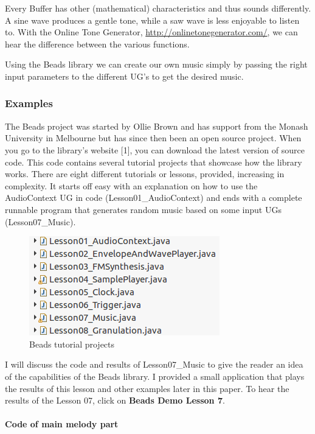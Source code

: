 \documentclass[12pt]{article}
\begin{document}
Every Buffer has other (mathematical) characteristics and thus sounds differently. A sine wave produces a gentle tone, while a saw wave is less enjoyable to listen to. With the Online Tone Generator, \url{http://onlinetonegenerator.com/}, we can hear the difference between the various functions.
\newline

Using the Beads library we can create our own music simply by passing the right input parameters to the different UG's to get the desired music.

\subsubsection{Examples}

The Beads project was started by Ollie Brown and has support from the Monash University in Melbourne but has since then been an open source project. When you go to the library's website [1], you can download the latest version of source code. This code contains several tutorial projects that showcase how the library works. There are eight different tutorials or lessons,  provided, increasing in complexity. It starts off easy with an explanation on how to use the AudioContext UG in code (Lesson01\_AudioContext) and ends with a complete runnable program that generates random music based on some input UGs (Lesson07\_Music).

\begin{figure}[h]
\centering
\includegraphics[scale=0.67]{img/beads_tut}
\caption{Beads tutorial projects}
\end{figure}

I will discuss the code and results of Lesson07\_Music to give the reader an idea of the capabilities of the Beads library. I provided a small application that plays the results of this lesson and other examples later in this paper. To hear the results of the Lesson 07, click on \textbf{Beads Demo Lesson 7}.

\paragraph{Code of main melody part}
\end{document}

